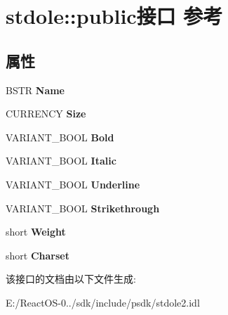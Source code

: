 \hypertarget{interfacestdole_1_1public}{}\section{stdole\+:\+:public接口 参考}
\label{interfacestdole_1_1public}
\subsection*{属性}
\begin{DoxyCompactItemize}
\item 
\mbox{\label{interfacestdole_1_1public_a4c5d81e54c3ea83b8f8ae19a4a3fc8d4}} 
B\+S\+TR {\bfseries Name}
\item 
\mbox{\label{interfacestdole_1_1public_aa7e846cbf1e37d06aec934e43d14f5e6}} 
C\+U\+R\+R\+E\+N\+CY {\bfseries Size}
\item 
\mbox{\label{interfacestdole_1_1public_a6620d4f33ba304e0acb57a9aa2eae02d}} 
V\+A\+R\+I\+A\+N\+T\+\_\+\+B\+O\+OL {\bfseries Bold}
\item 
\mbox{\label{interfacestdole_1_1public_ab63d927dcfa41d7965fa9da02b7abf08}} 
V\+A\+R\+I\+A\+N\+T\+\_\+\+B\+O\+OL {\bfseries Italic}
\item 
\mbox{\label{interfacestdole_1_1public_a900a82e8b1d1a1da40875d6ee30b7f18}} 
V\+A\+R\+I\+A\+N\+T\+\_\+\+B\+O\+OL {\bfseries Underline}
\item 
\mbox{\label{interfacestdole_1_1public_a367be0adb2df33772469c271b1ec3b92}} 
V\+A\+R\+I\+A\+N\+T\+\_\+\+B\+O\+OL {\bfseries Strikethrough}
\item 
\mbox{\label{interfacestdole_1_1public_acf4c5d0535aa51070887dd70816392e6}} 
short {\bfseries Weight}
\item 
\mbox{\label{interfacestdole_1_1public_a7ee36b906d88d8f631a4d2e132427172}} 
short {\bfseries Charset}
\end{DoxyCompactItemize}


该接口的文档由以下文件生成\+:\begin{DoxyCompactItemize}
\item 
E\+:/\+React\+O\+S-\/0../sdk/include/psdk/stdole2.\+idl\end{DoxyCompactItemize}
